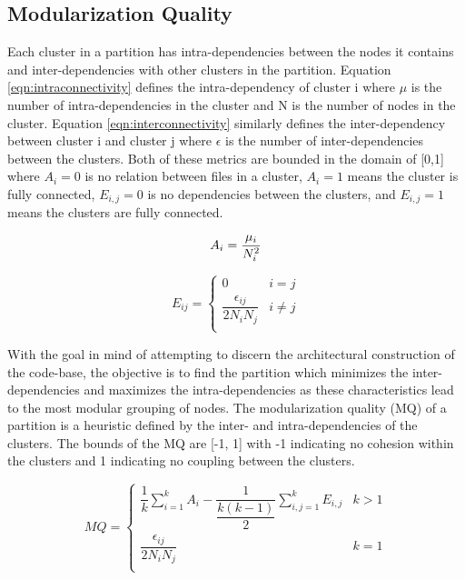 \subsection{Modularization Quality}
\label{subsec:mq_description}

Each cluster in a partition has intra-dependencies between the nodes it contains and inter-dependencies with other clusters in the partition. Equation \ref{eqn:intraconnectivity} defines the intra-dependency of cluster i where $\mu$ is the number of intra-dependencies in the cluster and N is the number of nodes in the cluster. Equation \ref{eqn:interconnectivity} similarly defines the inter-dependency between cluster i and cluster j where $\epsilon$ is the number of inter-dependencies between the clusters. Both of these metrics are bounded in the domain of [0,1] where $A_i = 0$ is no relation between files in a cluster, $A_i = 1$ means the cluster is fully connected, $E_{i,j} = 0$ is no dependencies between the clusters, and $E_{i,j} = 1$ means the clusters are fully connected. 

\begin{equation}
    A_i = \dfrac{\mu_i}{N_i^2} \\
    \label{eqn:intraconnectivity}
\end{equation}

\begin{equation}
    E_{ij} =
    \begin{cases}
        0 & i = j \\
        \dfrac{\epsilon_{ij}}{2N_iN_j} & i \ne j \\
    \end{cases}
    \label{eqn:interconnectivity}
\end{equation}

With the goal in mind of attempting to discern the architectural construction of the code-base, the objective is to find the partition which minimizes the inter-dependencies and maximizes the intra-dependencies as these characteristics lead to the most modular grouping of nodes. The modularization quality (MQ) of a partition is a heuristic defined by the inter- and intra-dependencies of the clusters. The bounds of the MQ are [-1, 1] with -1 indicating no cohesion within the clusters and 1 indicating no coupling between the clusters.

\begin{equation}
    MQ =
    \begin{cases}
        \dfrac{1}{k} \sum_{i=1}^{k} A_i - \dfrac{1}{\dfrac{k(k-1)}{2}} \sum_{i,j=1}^{k} E_{i,j} & k > 1 \\
        \dfrac{\epsilon_{ij}}{2N_iN_j} & k = 1 \\
    \end{cases}
    \label{eqn:mq_heuristic}
\end{equation}

